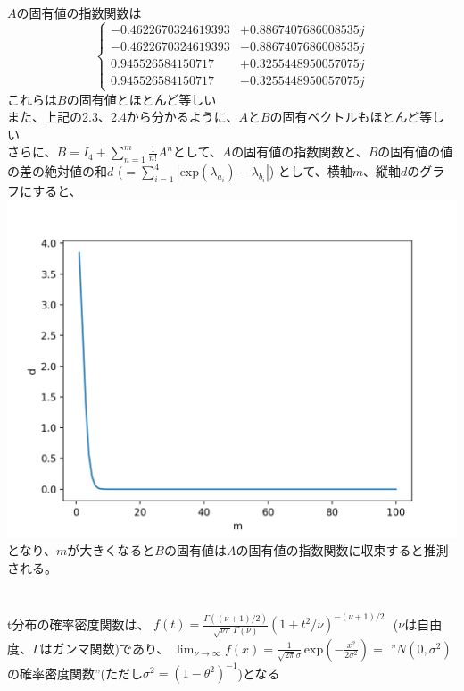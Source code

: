 \documentclass{jsarticle}
\begin{document}
\subsection{}
$A$の固有値の指数関数は
\[
\left\{
	\begin{alignedat}{1}
		-0.4622670324619393&+0.8867407686008535j\\
		-0.4622670324619393&-0.8867407686008535j\\
		0.945526584150717&+0.3255448950057075j\\
		0.945526584150717&-0.3255448950057075j
	\end{alignedat}
\right.
\]
これらは$B$の固有値とほとんど等しい\\
また、上記の2.3、2.4から分かるように、$A$と$B$の固有ベクトルもほとんど等しい\\
さらに、$\displaystyle B = I_{4} + \sum_{n=1}^{m} \frac{1}{n!} A^{n}$として、$A$の固有値の指数関数と、$B$の固有値の値の差の絶対値の和$d\,\,$($\displaystyle = \sum_{i=1}^{4} |\mathrm{exp}(\lambda_{a_{i}}) - \lambda_{b_{i}}|$)
として、横軸$m$、縦軸$d$のグラフにすると、\\
\includegraphics{1.png}\\
となり、$m$が大きくなると$B$の固有値は$A$の固有値の指数関数に収束すると推測される。
\\
\section{}
t分布の確率密度関数は、
$\displaystyle f(t) = \frac{\Gamma((\nu+1)/2)}{\sqrt{\nu\pi}\,\Gamma(\nu)} (1+t^{2}/\nu)^{-(\nu+1)/2}$\,\,
($\nu$は自由度、$\Gamma$はガンマ関数)であり、
$\displaystyle \lim_{\nu \to \infty} f(x) = \frac{1}{\sqrt{2\pi}\sigma} \, \mathrm{exp} \left( -\frac{x^{2}}{2\sigma^{2}} \right) = $
”$N(0,\sigma^2)$の確率密度関数”(ただし$\sigma^2 = (1-\theta^2)^{-1}$)となる
\end{document}
